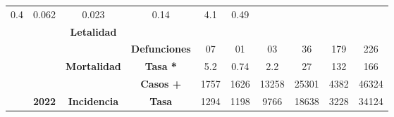 \begin{tabular}{lccc|cccccc|}
		\multicolumn{1}{c|}{\cellcolor[HTML]{E2EFDA}0.4} &
		\multicolumn{1}{c|}{\cellcolor[HTML]{E2EFDA}0.062} &
		\multicolumn{1}{c|}{\cellcolor[HTML]{E2EFDA}0.023} &
		\multicolumn{1}{c|}{\cellcolor[HTML]{E2EFDA}0.14} &
		\multicolumn{1}{c|}{\cellcolor[HTML]{E2EFDA}4.1} &
		\cellcolor[HTML]{E2EFDA}0.49 \\ \cline{4-10} 
		\multicolumn{1}{l|}{} &
		\multicolumn{1}{c|}{\cellcolor[HTML]{E2EFDA}} &
		\multicolumn{1}{c|}{\multirow{-2}{*}{\cellcolor[HTML]{E2EFDA}\textbf{Letalidad}}} &
		\cellcolor[HTML]{E2EFDA} &
		\multicolumn{1}{c|}{\cellcolor[HTML]{E2EFDA}} &
		\multicolumn{1}{c|}{\cellcolor[HTML]{E2EFDA}} &
		\multicolumn{1}{c|}{\cellcolor[HTML]{E2EFDA}} &
		\multicolumn{1}{c|}{\cellcolor[HTML]{E2EFDA}} &
		\multicolumn{1}{c|}{\cellcolor[HTML]{E2EFDA}} &
		\cellcolor[HTML]{E2EFDA} \\ \cline{3-3}
		\multicolumn{1}{l|}{} &
		\multicolumn{1}{c|}{\cellcolor[HTML]{E2EFDA}} &
		\multicolumn{1}{c|}{\cellcolor[HTML]{E2EFDA}} &
		\multirow{-2}{*}{\cellcolor[HTML]{E2EFDA}\textbf{Defunciones}} &
		\multicolumn{1}{c|}{\multirow{-2}{*}{\cellcolor[HTML]{E2EFDA}07}} &
		\multicolumn{1}{c|}{\multirow{-2}{*}{\cellcolor[HTML]{E2EFDA}01}} &
		\multicolumn{1}{c|}{\multirow{-2}{*}{\cellcolor[HTML]{E2EFDA}03}} &
		\multicolumn{1}{c|}{\multirow{-2}{*}{\cellcolor[HTML]{E2EFDA}36}} &
		\multicolumn{1}{c|}{\multirow{-2}{*}{\cellcolor[HTML]{E2EFDA}179}} &
		\multirow{-2}{*}{\cellcolor[HTML]{E2EFDA}226} \\ \cline{4-10} 
		\multicolumn{1}{l|}{} &
		\multicolumn{1}{c|}{\cellcolor[HTML]{E2EFDA}} &
		\multicolumn{1}{c|}{\multirow{-2}{*}{\cellcolor[HTML]{E2EFDA}\textbf{Mortalidad}}} &
		\cellcolor[HTML]{E2EFDA}\textbf{Tasa *} &
		\multicolumn{1}{c|}{\cellcolor[HTML]{E2EFDA}5.2} &
		\multicolumn{1}{c|}{\cellcolor[HTML]{E2EFDA}0.74} &
		\multicolumn{1}{c|}{\cellcolor[HTML]{E2EFDA}2.2} &
		\multicolumn{1}{c|}{\cellcolor[HTML]{E2EFDA}27} &
		\multicolumn{1}{c|}{\cellcolor[HTML]{E2EFDA}132} &
		\cellcolor[HTML]{E2EFDA}166 \\ \cline{3-10} 
		\multicolumn{1}{l|}{} &
		\multicolumn{1}{c|}{\cellcolor[HTML]{E2EFDA}} &     
		\multicolumn{1}{c|}{\cellcolor[HTML]{E2EFDA}} &
		\cellcolor[HTML]{E2EFDA}\textbf{Casos +} &
		\multicolumn{1}{c|}{\cellcolor[HTML]{E2EFDA}1757} &
		\multicolumn{1}{c|}{\cellcolor[HTML]{E2EFDA}1626} &
		\multicolumn{1}{c|}{\cellcolor[HTML]{E2EFDA}13258} &
		\multicolumn{1}{c|}{\cellcolor[HTML]{E2EFDA}25301} &
		\multicolumn{1}{c|}{\cellcolor[HTML]{E2EFDA}4382} &
		\cellcolor[HTML]{E2EFDA}46324 \\ \cline{4-10} 
		\multicolumn{1}{l|}{} &
		\multicolumn{1}{c|}{\multirow{-6}{*}{\cellcolor[HTML]{E2EFDA}\textbf{2022}}} &
		\multicolumn{1}{c|}{\multirow{-2}{*}{\cellcolor[HTML]{E2EFDA}\textbf{Incidencia}}} &
		\cellcolor[HTML]{E2EFDA}\textbf{Tasa} &
		\multicolumn{1}{c|}{\cellcolor[HTML]{E2EFDA}1294} &
		\multicolumn{1}{c|}{\cellcolor[HTML]{E2EFDA}1198} &
		\multicolumn{1}{c|}{\cellcolor[HTML]{E2EFDA}9766} &
		\multicolumn{1}{c|}{\cellcolor[HTML]{E2EFDA}18638} &
		\multicolumn{1}{c|}{\cellcolor[HTML]{E2EFDA}3228} &
		\cellcolor[HTML]{E2EFDA}34124 \\ \cline{2-10} 
	\end{tabular}
